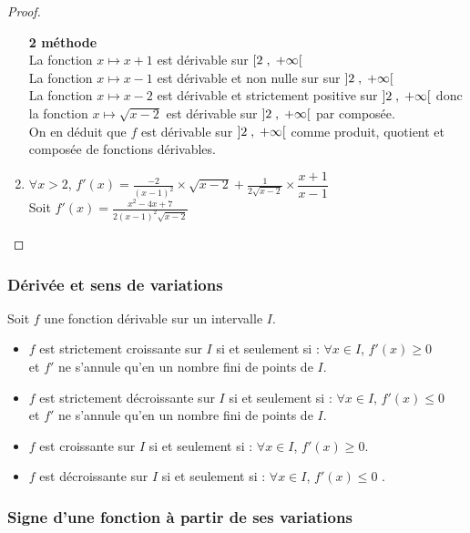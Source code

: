 \begin{proof}
\begin{enumerate}
\textbf{ 2\iere{} méthode } \\  La fonction $ x \mapsto x+1 $ est  dérivable sur $\left[2 \;,\; +\infty\right[ $ \\ La fonction $ x \mapsto x-1 $ est  dérivable et non nulle  sur sur $\left]2 \;,\; +\infty\right[ $   \\ La fonction $ x \mapsto x-2$ est  dérivable et strictement positive sur $\left]2 \;,\; +\infty\right[$ donc la fonction $ x \mapsto \sqrt{x-2} $ est   dérivable sur $\left]2 \;,\; +\infty\right[$ par composée.\\ On en déduit que $ f $ est dérivable  sur $\left]2 \;,\; +\infty\right[$ comme produit, quotient et composée de  fonctions dérivables. 

 \item $ \forall x > 2  $, $ f'(x)= \frac{-2}{(x-1)^{2}}\times \sqrt{x-2}+ \frac{1}{2\sqrt{x-2}}\times \dfrac{x+1}{x-1} $\\
Soit  $ f'(x)=\frac{x^{2}-4x+7}{2(x-1)^{2}\sqrt{x-2}} $
\end{enumerate}
\end{proof}
\subsubsection*{Dérivée et sens de variations}
\begin{theorem}
Soit $ f $ une fonction dérivable sur un intervalle $ I. $
\begin{itemize}
\item[\textbullet] $f$ est strictement croissante sur $I$ si et seulement si : $ ∀ x\in I$, $f '(x) ≥ 0 $ \\et $f'$ ne s'annule qu'en un nombre fini de points de $I$. 
\item[\textbullet] $f$ est strictement décroissante sur $I$ si et seulement si : $ ∀ x\in I$, $f '(x)  \leq 0 $ \\ et $f'$ ne s'annule qu'en un nombre fini de points de $I$.
\item[\textbullet] $f$ est  croissante sur $I$ si et seulement si : $ ∀ x\in I$, $f '(x) ≥ 0 $. 
\item[\textbullet] $f$ est  décroissante sur $I$ si et seulement si : $ ∀ x\in I$, $f '(x) \leq 0 $ .  
\end{itemize}
\end{theorem}
 \subsubsection*{Signe d'une fonction à partir de ses variations}


